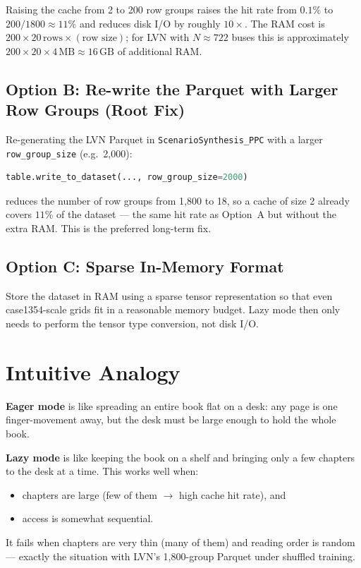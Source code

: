 \documentclass{article}
\begin{document}
Raising the cache from 2 to 200 row groups raises the hit rate from
$0.1\%$ to $200/1800 \approx 11\%$ and reduces disk I/O by roughly
$10\times$.  The RAM cost is $200 \times 20\,\text{rows} \times
(\text{row size})$; for LVN with $N \approx 722$ buses this is
approximately $200 \times 20 \times 4\,\text{MB} \approx 16\,\text{GB}$
of additional RAM.

\subsection{Option B: Re-write the Parquet with Larger Row Groups
  (Root Fix)}

Re-generating the LVN Parquet in \texttt{ScenarioSynthesis\_PPC} with a
larger \texttt{row\_group\_size} (e.g.\ 2{,}000):

\begin{lstlisting}[language=Python]
table.write_to_dataset(..., row_group_size=2000)
\end{lstlisting}

reduces the number of row groups from 1{,}800 to 18, so a cache of size 2
already covers $11\%$ of the dataset --- the same hit rate as Option~A but
without the extra RAM.  This is the preferred long-term fix.

\subsection{Option C: Sparse In-Memory Format}

Store the dataset in RAM using a sparse tensor representation so that even
case1354-scale grids fit in a reasonable memory budget.  Lazy mode then
only needs to perform the tensor type conversion, not disk I/O.

\section{Intuitive Analogy}

\textbf{Eager mode} is like spreading an entire book flat on a desk: any
page is one finger-movement away, but the desk must be large enough to hold
the whole book.

\textbf{Lazy mode} is like keeping the book on a shelf and bringing only a
few chapters to the desk at a time.  This works well when:
\begin{itemize}[noitemsep]
  \item chapters are large (few of them $\to$ high cache hit rate), and
  \item access is somewhat sequential.
\end{itemize}
It fails when chapters are very thin (many of them) and reading order is
random --- exactly the situation with LVN's 1{,}800-group Parquet under
shuffled training.
\end{document}
